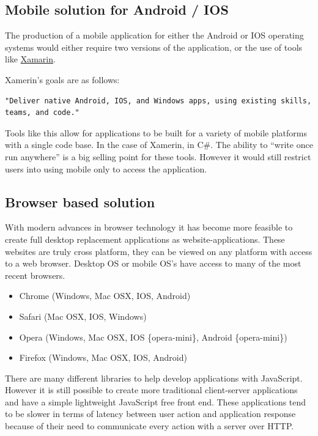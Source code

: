 \subsection{Mobile solution for Android / IOS}%
\label{mobile-solution-for-android-ios}

The production of a mobile application for either the Android or IOS operating
systems would either require two versions of the application, or the use of
tools like \href{https://www.xamarin.com/platform}{Xamarin}.

Xamerin's goals are as follows:
\begin{verbatim}
"Deliver native Android, IOS, and Windows apps, using existing skills,
teams, and code."
\end{verbatim}\cite{Xamerin}

Tools like this allow for applications to be built for a variety of mobile
platforms with a single code base. In the case of Xamerin, in C\#. The ability
to ``write once run anywhere'' is a big selling point for these tools. However
it would still restrict users into using mobile only to access the application.

\subsection{Browser based solution}\label{browser-based-solution}

With modern advances in browser technology it has become more feasible to create
full desktop replacement applications as website-applications. These websites
are truly cross platform, they can be viewed on any platform with access to a
web browser. Desktop OS or mobile OS's have access to many of the most
recent browsers.

\begin{itemize}
  \item Chrome (Windows, Mac OSX, IOS, Android)
  \item Safari (Mac OSX, IOS, Windows)
  \item Opera (Windows, Mac OSX, IOS \{opera-mini\}, Android \{opera-mini\})
  \item Firefox (Windows, Mac OSX, IOS, Android)
\end{itemize}

There are many different libraries to help develop applications with JavaScript.
However it is still possible to create more traditional client-server
applications and have a simple lightweight JavaScript free front end. These
applications tend to be slower in terms of latency between user action and
application response because of their need to communicate every action with a
server over HTTP.

